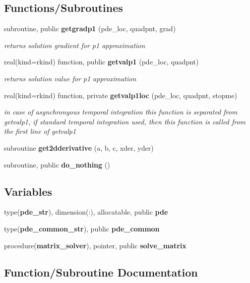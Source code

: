 \subsection*{Functions/\+Subroutines}
\begin{DoxyCompactItemize}
\item 
subroutine, public {\bf getgradp1} (pde\+\_\+loc, quadpnt, grad)
\begin{DoxyCompactList}\small\item\em returns solution gradient for p1 approximation \end{DoxyCompactList}\item 
real(kind=rkind) function, public {\bf getvalp1} (pde\+\_\+loc, quadpnt)
\begin{DoxyCompactList}\small\item\em returns solution value for p1 approximation \end{DoxyCompactList}\item 
real(kind=rkind) function, private {\bf getvalp1loc} (pde\+\_\+loc, quadpnt, stopme)
\begin{DoxyCompactList}\small\item\em in case of asynchronyous temporal integration this function is separated from getvalp1, if standard temporal integration used, then this function is called from the first line of getvalp1 \end{DoxyCompactList}\item 
subroutine {\bf get2dderivative} (a, b, c, xder, yder)
\item 
subroutine, public {\bf do\+\_\+nothing} ()
\end{DoxyCompactItemize}
\subsection*{Variables}
\begin{DoxyCompactItemize}
\item 
type({\bf pde\+\_\+str}), dimension(\+:), allocatable, public {\bf pde}
\item 
type({\bf pde\+\_\+common\+\_\+str}), public {\bf pde\+\_\+common}
\item 
procedure({\bf matrix\+\_\+solver}), pointer, public {\bf solve\+\_\+matrix}
\end{DoxyCompactItemize}


\subsection{Function/\+Subroutine Documentation}
